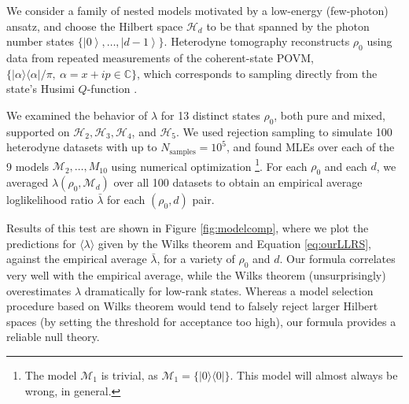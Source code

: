 \documentclass[aps,pra, twocolumn]{revtex4-1}
\newcommand{\M}{\mathcal{M}}
\newcommand{\ket}[1]{\ensuremath{\left|#1\right\rangle}}
\begin{document}
We consider a family of nested models motivated by a low-energy (few-photon) ansatz, and choose   
the Hilbert space $\mathcal{H}_d$ to be that spanned by the photon number states $\{\ket{0},\ldots ,\ket{d-1}\}$.
Heterodyne tomography reconstructs $\rho_{0}$ using data from repeated measurements of the 
coherent-state POVM, $\{|\alpha\rangle\langle \alpha| /\pi, ~\alpha=x+ip\in \mathbb{C}\}$, which corresponds to sampling directly from the 
state's Husimi $Q$-function \cite{Husimi1940}.

We examined the behavior of $\lambda$ for 13 distinct states $\rho_{0}$, both pure and mixed, supported on $\mathcal{H}_{2}, \mathcal{H}_{3}, \mathcal{H}
_{4}$, and $\mathcal{H}_{5}$.  We used rejection sampling to simulate 100 heterodyne datasets with up to $N_{\mathrm{samples}}=10^5$, and found MLEs over each of the 9 models $\M_2, \ldots, M_{10}$ using numerical optimization \footnote{The model $\M_{1}$ is trivial, as $\M_{1} = \{|0\rangle \langle 0|\}$. This model will almost always be wrong, in general.}.  For each $\rho_{0}$ and each $d$, we averaged $\lambda(\rho_{0}, \M_{d})$ over all 100 datasets to obtain an empirical average loglikelihood ratio $\bar{\lambda}$ for each $(\rho_0,d)$ pair.

Results of this test are shown in Figure \ref{fig:modelcomp}, where we plot the predictions for $\langle \lambda \rangle$ given by the Wilks theorem and Equation \eqref{eq:ourLLRS}, against the empirical average $\bar\lambda$, for a variety of $\rho_{0}$ and $d$. Our formula correlates very well with the empirical average, while the Wilks theorem (unsurprisingly) overestimates $\lambda$ dramatically for low-rank states.  Whereas a model selection procedure based on Wilks theorem would tend to falsely reject larger Hilbert spaces (by setting the threshold for acceptance too high), our formula provides a reliable null theory.
\end{document}
